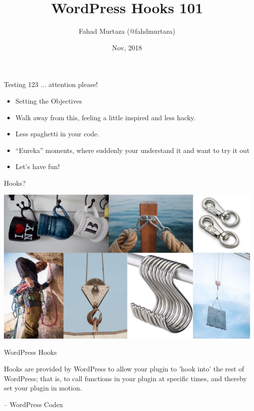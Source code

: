 \documentclass[10pt]{beamer}
\title{WordPress Hooks 101}
\date{Nov, 2018}
\author{Fahad Murtaza (@fahdmurtaza)}
\institute{WordCamp Biratnagar, 2018}
\begin{document}
    \maketitle

    \begin{frame}{Testing 123 ... attention please!}
        \begin{itemize}
            \item Setting the Objectives
            \item Walk away from this, feeling a little inspired and less hacky.
            \item Less spaghetti in your code. 
            \item “Eureka” moments, where suddenly your understand it and want to try it out
            \item Let’s have fun!
        \end{itemize}
    \end{frame}

    \begin{frame}{Hooks?}
        \begin{center}
            \includegraphics[width=1\textwidth]{images/hooks}
        \end{center}
    \end{frame}

    \begin{frame}{WordPress Hooks}
        \begin{large}
            Hooks are provided by WordPress to allow your plugin to 'hook into' the rest of WordPress; that is, to call functions in your plugin at specific times, and thereby set your plugin in motion.   
        \end{large}
        \begin{flushright}
            -- WordPress Codex
        \end{flushright}
    \end{frame}
\end{document}
